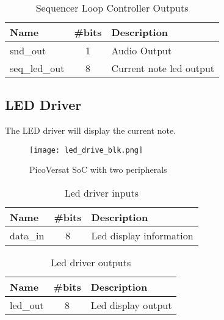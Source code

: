 \begin{table}[h!]
    \centering
    \caption{Sequencer Loop Controller Outputs}
    \label{tab:slcOut}
    \begin{tabular}{@{}lcl@{}}
    \toprule
    Name          & \multicolumn{1}{l}{\#bits} & Description             \\ \midrule
    snd\_out      & 1                          & Audio Output            \\
    seq\_led\_out & 8                          & Current note led output \\ \bottomrule
    \end{tabular}
    \end{table}

\subsection{LED Driver}

The LED driver will display the current note. 

\begin{figure}[!htbp]
    \centerline{\texttt{[image: led\_drive\_blk.png]}}
    \vspace{0cm}\caption{PicoVersat SoC with two peripherals}
    \label{fig:periphs}
\end{figure}

\begin{table}[h]
    \centering
    \caption{Led driver inputs}
    \label{tab:ledIn}
    \begin{tabular}{@{}lll@{}}
    \toprule
    Name     & \#bits                & Description             \\ \midrule
    data\_in & \multicolumn{1}{c}{8} & Led display information \\ \bottomrule
    \end{tabular}
    \end{table}

\begin{table}[h]
    \centering
    \caption{Led driver outputs}
    \label{tab:ledOut}
    \begin{tabular}{@{}lll@{}}
    \toprule
    Name     & \#bits                & Description        \\ \midrule
    led\_out & \multicolumn{1}{c}{8} & Led display output \\ \bottomrule
    \end{tabular}
    \end{table}



